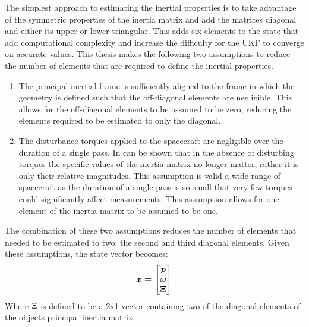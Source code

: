 The simplest approach to estimating the inertial properties is to take advantage of the symmetric properties of the inertia matrix and add the matrices diagonal and either its upper or lower triangular. This adds six elements to the state that add computational complexity and increase the difficulty for the UKF to converge on accurate values. This thesis makes the following two assumptions to reduce the number of elements that are required to define the inertial properties.
\begin{enumerate}
\item The principal inertial frame is sufficiently aligned to the frame in which the geometry is defined such that the off-diagonal elements are negligible. This allows for the off-diagonal elements to be assumed to be zero, reducing the elements required to be estimated to only the diagonal.

\item The disturbance torques applied to the spacecraft are negligible over the duration of a single pass. In can be shown that in the absence of disturbing torques the specific values of the inertia matrix no longer matter, rather it is only their relative magnitudes. This assumption is valid a wide range of spacecraft as the duration of a single pass is so small that very few torques could significantly affect measurements. This assumption allows for one element of the inertia matrix to be assumed to be one.
\end{enumerate}
The combination of these two assumptions reduces the number of elements that needed to be estimated to two: the second and third diagonal elements. Given these assumptions, the state vector becomes:
\begin{equation}
\boldmath{x = \begin{bmatrix} p \\ \omega \\ \Xi \end{bmatrix}}
\end{equation}
Where $\boldmath{\Xi}$ is defined to be a 2x1 vector containing two of the diagonal elements of the objects principal inertia matrix.
